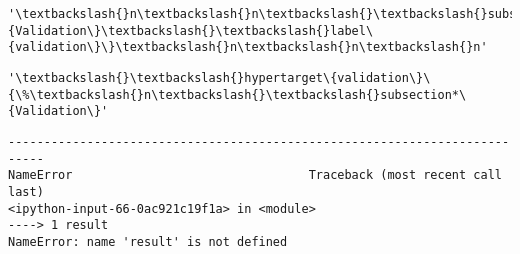 \begin{tcolorbox}[breakable, size=fbox, boxrule=.5pt, pad at break*=1mm, opacityfill=0]
\begin{Verbatim}[commandchars=\\\{\}]
'\textbackslash{}n\textbackslash{}n\textbackslash{}\textbackslash{}subsection*\{Validation\}\textbackslash{}\textbackslash{}label\{validation\}\}\textbackslash{}n\textbackslash{}n\textbackslash{}n'
\end{Verbatim}
\end{tcolorbox}
\begin{tcolorbox}[breakable, size=fbox, boxrule=.5pt, pad at break*=1mm, opacityfill=0]
\begin{Verbatim}[commandchars=\\\{\}]
'\textbackslash{}\textbackslash{}hypertarget\{validation\}\{\%\textbackslash{}n\textbackslash{}\textbackslash{}subsection*\{Validation\}'
\end{Verbatim}
\end{tcolorbox}
\begin{Verbatim}[commandchars=\\\{\}]
---------------------------------------------------------------------------
NameError                                 Traceback (most recent call last)
<ipython-input-66-0ac921c19f1a> in <module>
----> 1 result
NameError: name 'result' is not defined
\end{Verbatim}
